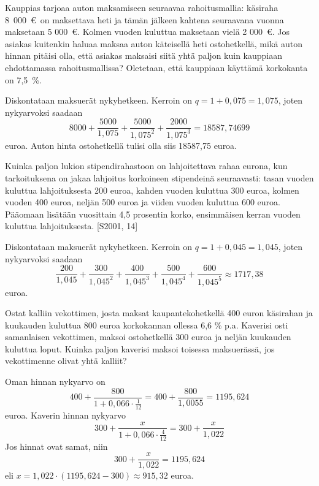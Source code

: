 \documentclass[a4paper,10pt]{article}\usepackage[]{graphicx}\usepackage[]{color}
\begin{document}
\begin{question} Kauppias tarjoaa auton maksamiseen seuraavaa rahoitusmallia: käsiraha 8~000~\euro \ on maksettava heti ja tämän
jälkeen kahtena seuraavana vuonna maksetaan 5 000~\euro. Kolmen vuoden kuluttua maksetaan vielä 2 000~\euro.
Jos asiakas kuitenkin haluaa maksaa auton käteisellä heti ostohetkellä, mikä auton hinnan pitäisi olla, että asiakas
maksaisi siitä yhtä paljon kuin kauppiaan ehdottamassa rahoitusmallissa? Oletetaan, että kauppiaan käyttämä korkokanta on 7{,}5~\%.
\end{question}\begin{solution}
    Diskontataan maksuerät nykyhetkeen. Kerroin on \(q= 1+0,075 = 1,075\), joten nykyarvoksi saadaan
    \[
        8000 + \frac{5000}{1,075} + \frac{5000}{1,075^2} + \frac{2000}{1,075^3} = 18587,74699
    \]
    euroa. Auton hinta ostohetkellä tulisi olla siis 18587,75 euroa.
\end{solution}


\begin{question} Kuinka paljon lukion stipendirahastoon on lahjoitettava rahaa eurona, kun tarkoituksena on jakaa lahjoitus korkoineen
stipendeinä seuraavasti: tasan vuoden kuluttua lahjoituksesta 200 euroa, kahden vuoden kuluttua 300 euroa,
kolmen vuoden 400 euroa, neljän 500 euroa ja viiden vuoden kuluttua 600 euroa. Pääomaan lisätään vuosittain 4,5 prosentin korko,
ensimmäisen kerran vuoden kuluttua lahjoituksesta. [S2001, 14]
\end{question}\begin{solution}
    Diskontataan maksuerät nykyhetkeen. Kerroin on \(q= 1+0,045 = 1,045\), joten nykyarvoksi saadaan
    \[
        \frac{200}{1,045} + \frac{300}{1,045^2} + \frac{400}{1,045^3} + \frac{500}{1,045^4} + \frac{600}{1,045^5} \approx 1717,38
    \]
    euroa.
\end{solution}

\begin{question} Ostat kalliin vekottimen, josta maksat kaupantekohetkellä 400 euron käsirahan ja kuukauden kuluttua 800 euroa korkokannan ollessa 6{,}6 \% p.a.
Kaverisi osti samanlaisen vekottimen, maksoi ostohetkellä 300 euroa ja neljän kuukauden kuluttua loput.
Kuinka paljon kaverisi maksoi toisessa maksuerässä, jos vekottimenne olivat yhtä kalliit?
\end{question}\begin{solution}
    Oman hinnan nykyarvo on
    \[
        400 + \frac{800}{1+0,066\cdot\frac{1}{12}} = 400 + \frac{800}{1,0055} = 1195,624
    \]
    euroa. Kaverin hinnan nykyarvo
    \[
        300 + \frac{x}{1+0,066\cdot\frac{4}{12}} = 300 + \frac{x}{1,022}
    \]
    Jos hinnat ovat samat, niin
    \[
        300 + \frac{x}{1,022} =  1195,624
    \]
    eli \( x = 1,022\cdot(1195,624-300)\approx 915,32\) euroa.
\end{solution}
\end{document}
